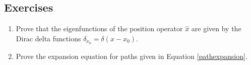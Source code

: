 \documentclass[book.tex]{subfiles}
\begin{document}
\subsection{Exercises}
\begin{enumerate}
    \item Prove that the eigenfunctions of the position operator $\hat{x}$ are given by the Dirac delta functions $\delta_{x_0} = \delta(x - x_0)$.
    \item Prove the expansion equation for paths given in Equation \ref{pathexpansion}.
\end{enumerate}


\section{}
\end{document}
